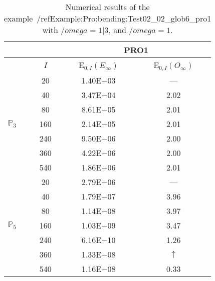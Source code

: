 \begin{table}[H]
\caption{Numerical results of the example~/ref{Example:Pro:bending:Test02_02_glob6_pro1} with $/omega=1|3$, and $/omega=1$.}
\setlength{\tabcolsep}{5pt}
\centering
\begin{tabular}{@{}l c c c@{}}
\toprule
 &  & \multicolumn{2}{c}{PRO1}\\
\midrule
 & $I$ & E$_{0,I}(E_{\infty})$ & E$_{0,I}(O_{\infty})$\\
\midrule
\multirow{7}{*}{$\mathbb{P}_{3}$}
 & 20 & 1.40E$-$03 & ---\\
 & 40 & 3.47E$-$04 & 2.02\\
 & 80 & 8.61E$-$05 & 2.01\\
 & 160 & 2.14E$-$05 & 2.01\\
 & 240 & 9.50E$-$06 & 2.00\\
 & 360 & 4.22E$-$06 & 2.00\\
 & 540 & 1.86E$-$06 & 2.01\\
\midrule
\multirow{7}{*}{$\mathbb{P}_{5}$}
 & 20 & 2.79E$-$06 & ---\\
 & 40 & 1.79E$-$07 & 3.96\\
 & 80 & 1.14E$-$08 & 3.97\\
 & 160 & 1.03E$-$09 & 3.47\\
 & 240 & 6.16E$-$10 & 1.26\\
 & 360 & 1.33E$-$08 & $\uparrow$\\
 & 540 & 1.16E$-$08 & 0.33\\
\bottomrule
\end{tabular}
\label{Table:PRO:test_02_02_test22_pro1}
\end{table}
